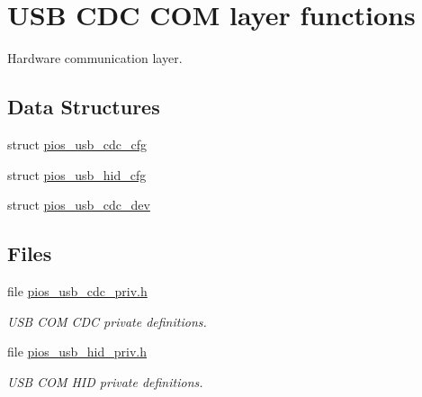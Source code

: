 \hypertarget{group___p_i_o_s___u_s_b___c_o_m}{\section{\-U\-S\-B \-C\-D\-C \-C\-O\-M layer functions}
\label{group___p_i_o_s___u_s_b___c_o_m}
}


\-Hardware communication layer.  


\subsection*{\-Data \-Structures}
\begin{DoxyCompactItemize}
\item 
struct \hyperlink{structpios__usb__cdc__cfg}{pios\-\_\-usb\-\_\-cdc\-\_\-cfg}
\item 
struct \hyperlink{structpios__usb__hid__cfg}{pios\-\_\-usb\-\_\-hid\-\_\-cfg}
\item 
struct \hyperlink{structpios__usb__cdc__dev}{pios\-\_\-usb\-\_\-cdc\-\_\-dev}
\end{DoxyCompactItemize}
\subsection*{\-Files}
\begin{DoxyCompactItemize}
\item 
file \hyperlink{pios__usb__cdc__priv_8h}{pios\-\_\-usb\-\_\-cdc\-\_\-priv.\-h}
\begin{DoxyCompactList}\small\item\em \-U\-S\-B \-C\-O\-M \-C\-D\-C private definitions. \end{DoxyCompactList}\item 
file \hyperlink{pios__usb__hid__priv_8h}{pios\-\_\-usb\-\_\-hid\-\_\-priv.\-h}
\begin{DoxyCompactList}\small\item\em \-U\-S\-B \-C\-O\-M \-H\-I\-D private definitions. \end{DoxyCompactList}\end{DoxyCompactItemize}
